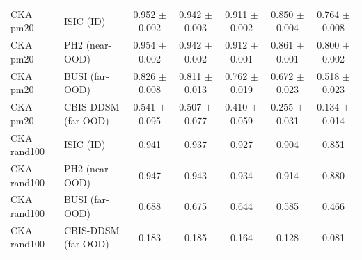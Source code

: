 \begin{tabular}{llccccc}
CKA pm20 & ISIC (ID) & 0.952 $\pm$ 0.002 & 0.942 $\pm$ 0.003 & 0.911 $\pm$ 0.002 & 0.850 $\pm$ 0.004 & 0.764 $\pm$ 0.008 \\
CKA pm20 & PH2 (near-OOD) & 0.954 $\pm$ 0.002 & 0.942 $\pm$ 0.002 & 0.912 $\pm$ 0.001 & 0.861 $\pm$ 0.001 & 0.800 $\pm$ 0.002 \\
CKA pm20 & BUSI (far-OOD) & 0.826 $\pm$ 0.008 & 0.811 $\pm$ 0.013 & 0.762 $\pm$ 0.019 & 0.672 $\pm$ 0.023 & 0.518 $\pm$ 0.023 \\
CKA pm20 & CBIS-DDSM (far-OOD) & 0.541 $\pm$ 0.095 & 0.507 $\pm$ 0.077 & 0.410 $\pm$ 0.059 & 0.255 $\pm$ 0.031 & 0.134 $\pm$ 0.014 \\
CKA rand100 & ISIC (ID) & 0.941 & 0.937 & 0.927 & 0.904 & 0.851 \\
CKA rand100 & PH2 (near-OOD) & 0.947 & 0.943 & 0.934 & 0.914 & 0.880 \\
CKA rand100 & BUSI (far-OOD) & 0.688 & 0.675 & 0.644 & 0.585 & 0.466 \\
CKA rand100 & CBIS-DDSM (far-OOD) & 0.183 & 0.185 & 0.164 & 0.128 & 0.081 \\
\bottomrule
\end{tabular}
